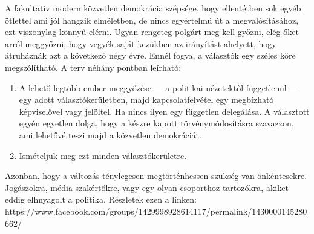 A fakultatív modern közvetlen demokrácia szépsége, hogy ellentétben sok egyéb ötlettel ami jól hangzik elméletben,
de nincs egyértelmű út a megvalósításához, ezt viszonylag könnyű elérni. Ugyan rengeteg polgárt meg kell
győzni, elég őket arról meggyőzni, hogy vegyék saját kezükben az irányítást ahelyett, hogy átruháznák
azt a következő négy évre. Ennél fogva, a választók egy széles köre megszólítható. A terv néhány pontban
leírható:
\begin{enumerate}
	\item A lehető legtöbb ember meggyőzése --- a politikai nézetektől függetlenül --- egy adott
	      választókerületben, majd kapcsolatfelvétel egy megbízható képviselővel vagy jelöltel. Ha nincs
	      ilyen egy független delegálása. A választott egyén egyetlen dolga, hogy a készre kapott
	      törvénymódosításra szavazzon, ami lehetővé teszi majd a közvetlen demokráciát.

	\item Ismételjük meg ezt minden választókerületre.

\end{enumerate}

Azonban, hogy a változás ténylegesen megtörténhessen szükség van önkéntesekre. Jogászokra, média szakértőkre,
vagy egy olyan csoporthoz tartozókra, akiket eddig elhnyagolt a politika. Részletek ezen a linken:
https://www.facebook.com/groups/1429998928614117/permalink/1430000145280662/